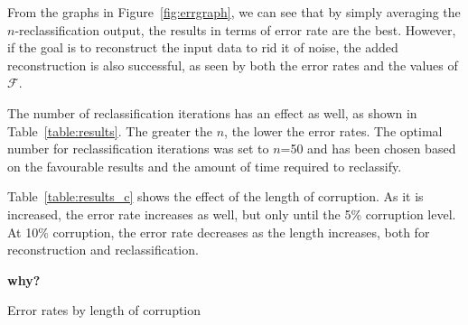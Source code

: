 \documentclass{report}
\begin{document}
From the graphs in Figure~\ref{fig:errgraph}, we can see that by simply averaging the $n$-reclassification output, the results in terms of error rate are the best. However, if the goal is to reconstruct the input data to rid it of noise, the added reconstruction is also successful, as seen by both the error rates and the values of $\mathcal{F}$. 

The number of reclassification iterations has an effect as well, as shown in Table~\ref{table:results}. The greater the $n$, the lower the error rates. The optimal number for reclassification iterations was set to $n$=50 and has been chosen based on the favourable results and the amount of time required to reclassify.

Table~\ref{table:results_c} shows the effect of the length of corruption. As it is increased, the error rate increases as well, but only until the 5\% corruption level. At 10\% corruption, the error rate decreases as the length increases, both for reconstruction and reclassification.

\textbf{why?}



\begin{table}
	\begin{footnotesize}
	\end{footnotesize}
	\caption{Error rates by length of corruption}
	\label{table:results_c}
\end{table}
\end{document}
